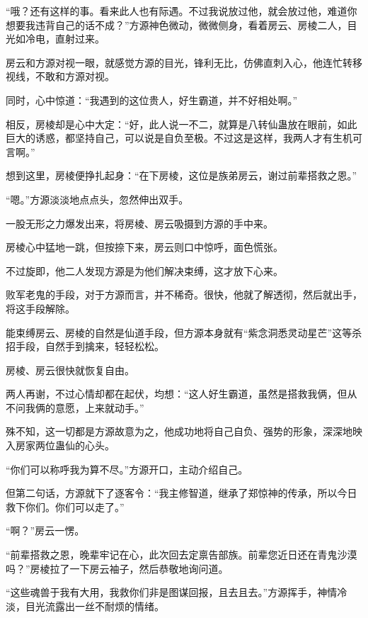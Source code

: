 
\begin{this_body}



“哦？还有这样的事。看来此人也有际遇。不过我说放过他，就会放过他，难道你想要我违背自己的话不成？”方源神色微动，微微侧身，看着房云、房棱二人，目光如冷电，直射过来。

房云和方源对视一眼，就感觉方源的目光，锋利无比，仿佛直刺入心，他连忙转移视线，不敢和方源对视。

同时，心中惊道：“我遇到的这位贵人，好生霸道，并不好相处啊。”

相反，房棱却是心中大定：“好，此人说一不二，就算是八转仙蛊放在眼前，如此巨大的诱惑，都坚持自己，可以说是自负至极。不过这是这样，我两人才有生机可言啊。”

想到这里，房棱便挣扎起身：“在下房棱，这位是族弟房云，谢过前辈搭救之恩。”

“嗯。”方源淡淡地点点头，忽然伸出双手。

一股无形之力爆发出来，将房棱、房云吸摄到方源的手中来。

房棱心中猛地一跳，但按捺下来，房云则口中惊呼，面色慌张。

不过旋即，他二人发现方源是为他们解决束缚，这才放下心来。

败军老鬼的手段，对于方源而言，并不稀奇。很快，他就了解透彻，然后就出手，将这手段解除。

能束缚房云、房棱的自然是仙道手段，但方源本身就有“紫念洞悉灵动星芒”这等杀招手段，自然手到擒来，轻轻松松。

房棱、房云很快就恢复自由。

两人再谢，不过心情却都在起伏，均想：“这人好生霸道，虽然是搭救我俩，但从不问我俩的意愿，上来就动手。”

殊不知，这一切都是方源故意为之，他成功地将自己自负、强势的形象，深深地映入房家两位蛊仙的心头。

“你们可以称呼我为算不尽。”方源开口，主动介绍自己。

但第二句话，方源就下了逐客令：“我主修智道，继承了郑惊神的传承，所以今日救下你们。你们可以走了。”

“啊？”房云一愣。

“前辈搭救之恩，晚辈牢记在心，此次回去定禀告部族。前辈您近日还在青鬼沙漠吗？”房棱拉了一下房云袖子，然后恭敬地询问道。

“这些魂兽于我有大用，我救你们非是图谋回报，且去且去。”方源挥手，神情冷淡，目光流露出一丝不耐烦的情绪。


\end{this_body}
